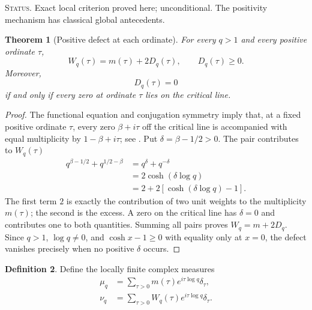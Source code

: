 \documentclass[11pt]{amsart}
\numberwithin{equation}{section}
\theoremstyle{plain}
\newtheorem{theorem}{Theorem}[section]
\theoremstyle{definition}
\newtheorem{definition}[theorem]{Definition}
\theoremstyle{remark}
\newcommand{\1}{\mathbf{1}}
\newcommand{\statusnote}[1]{%
  \par\smallskip\noindent
  \begingroup\footnotesize\textsc{Status.} #1\endgroup
  \par\smallskip}
\begin{document}
\statusnote{Exact local criterion proved here; unconditional.  The positivity mechanism has classical global antecedents.}
\begin{theorem}[Positive defect at each ordinate]
\label{thm:positive_defect}
For every \(q>1\) and every positive ordinate \(\tau\),
\begin{equation}
\boxed{
W_q(\tau)=m(\tau)+2D_q(\tau),
\qquad
D_q(\tau)\geq0.
}
\label{eq:W_m_D}
\end{equation}
Moreover,
\begin{equation}
D_q(\tau)=0
\label{eq:Dq_zero_condition}
\end{equation}
if and only if every zero at ordinate \(\tau\) lies on the critical line.
\end{theorem}

\begin{proof}
The functional equation and conjugation symmetry imply that, at a fixed
positive ordinate \(\tau\), every zero \(\beta+i\tau\) off the critical
line is accompanied with equal multiplicity by
\(1-\beta+i\tau\); see \cite[Chapter~2]{Titchmarsh1986}.  Put
\(\delta=\beta-1/2>0\).  The pair contributes to \(W_q(\tau)\)
\begin{align}
q^{\beta-1/2}+q^{1/2-\beta}
&=
q^\delta+q^{-\delta}
\label{eq:defect_pair_one}
\\
&=
2\cosh(\delta\log q)
\label{eq:defect_pair_two}
\\
&=
2+2\left[\cosh(\delta\log q)-1\right].
\label{eq:defect_pair_three}
\end{align}
The first term \(2\) is exactly the contribution of two unit weights to
the multiplicity \(m(\tau)\); the second is the excess.  A zero on the
critical line has \(\delta=0\) and contributes one to both quantities.
Summing all pairs proves \(W_q=m+2D_q\).  Since \(q>1\),
\(\log q\neq0\), and \(\cosh x-1\geq0\) with equality only at \(x=0\),
the defect vanishes precisely when no positive \(\delta\) occurs.
\end{proof}

\begin{definition}
\label{def:atomic_measures}
Define the locally finite complex measures
\begin{align}
\mu_q
&=
\sum_{\tau>0}
m(\tau)e^{i\tau\log q}\delta_\tau,
\label{eq:muq_measure}
\\
\nu_q
&=
\sum_{\tau>0}
W_q(\tau)e^{i\tau\log q}\delta_\tau.
\label{eq:nuq_measure}
\end{align}
\end{definition}
\end{document}
